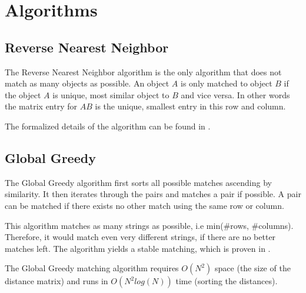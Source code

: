 \documentclass[a4paper,11pt]{article}
\begin{document}
\section{Algorithms}

\subsection{Reverse Nearest Neighbor}

The Reverse Nearest Neighbor algorithm is the only algorithm that does not match as many objects as possible.
An object $A$ is only matched to object $B$ if the object $A$ is unique, most similar object to $B$ and vice versa. In other words the matrix entry for $AB$ is the unique, smallest entry in this row and column.

The formalized details of the algorithm can be found in \cite[p. 29]{rnn}.
  
\subsection{Global Greedy}

The Global Greedy algorithm first sorts all possible matches ascending by similarity. It then iterates through the pairs and matches a pair if possible. A pair can be matched if there exists no other match using the same row or column.

This algorithm matches as many strings as possible, i.e min(\#rows, \#columns). Therefore, it would match even very different strings, if there are no better matches left. The algorithm yields a stable matching, which is proven in \cite{augsten}.


The Global Greedy matching algorithm requires $O(N^2)$ space (the size of the distance matrix) and runs in $O(N^2 log(N))$ time (sorting the distances).
\end{document}
